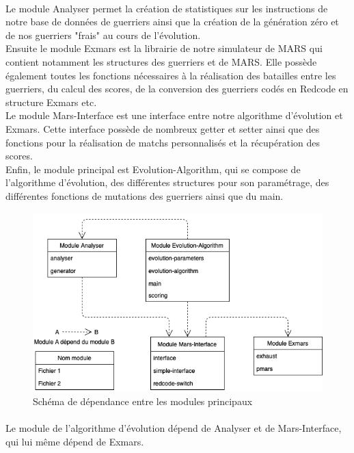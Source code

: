 \documentclass[french]{article}
\begin{document}
            \paragraph{} Le module Analyser permet la création de statistiques sur les instructions de notre base de données de guerriers ainsi que la création de la génération zéro et de nos guerriers "frais" au cours de l'évolution.\\
            Ensuite le module Exmars est la librairie de notre simulateur de MARS qui contient notamment les structures des guerriers et de MARS. Elle possède également toutes les fonctions nécessaires à la réalisation des batailles entre les guerriers, du calcul des scores, de la conversion des guerriers codés en Redcode en structure Exmars etc. \\
            Le module Mars-Interface est une interface entre notre algorithme d'évolution et Exmars. Cette interface possède de nombreux getter et setter ainsi que des fonctions pour la réalisation de matchs personnalisés et la récupération des scores. \\
            Enfin, le module principal est Evolution-Algorithm, qui se compose de l'algorithme d'évolution, des différentes structures pour son paramétrage, des différentes fonctions de mutations des guerriers ainsi que du main.
            
        \begin{figure}[!ht]
            \centering \includegraphics[scale=0.7]{image/Dependance.png}
            \caption{Schéma de dépendance entre les modules principaux}
        \end{figure}
        
        \paragraph{} Le module de l'algorithme d'évolution dépend de Analyser et de Mars-Interface, qui lui même dépend de Exmars.
\end{document}
